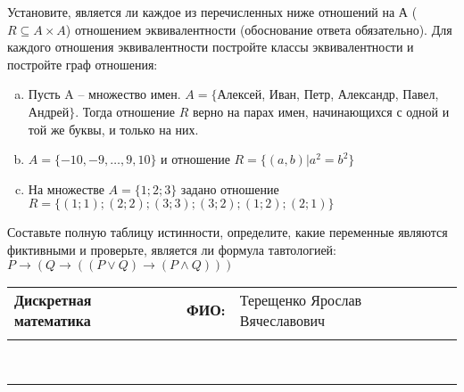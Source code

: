 \documentclass[10pt]{exam}
\newcommand{\class}{Дискретная математика}
\newcommand{\examdate}{}
\begin{document}
\begin{questions}
\question
Установите, является ли каждое из перечисленных ниже отношений на А ($R \subseteq A \times A$) отношением эквивалентности (обоснование ответа обязательно). Для каждого отношения эквивалентности постройте классы 
эквивалентности и постройте граф отношения:
\begin{enumerate} [a)]\setcounter{enumi}{0}
\item Пусть A – множество имен. $A = \{ $Алексей, Иван, Петр, Александр, Павел, Андрей$ \}$. Тогда отношение $R$ верно на парах имен, начинающихся с одной и той же буквы, и только на них.
\item $A = \{-10, -9, … , 9, 10\}$ и отношение $ R = \{(a,b)|a^{2} = b^{2}\}$
\item На множестве $A = \{1; 2; 3\}$ задано отношение $R = \{(1; 1); (2; 2); (3; 3); (3; 2); (1; 2); (2; 1)\}$
\end{enumerate}\question Составьте полную таблицу истинности, определите, какие переменные являются фиктивными и проверьте, является ли формула тавтологией:
$ P \rightarrow (Q \rightarrow ((P \lor Q) \rightarrow (P \land Q)))$

\end{questions}
\newpage
\begin{flushright}
\begin{tabular}{p{2.8in} r l}
\textbf{\class} & \textbf{ФИО:} &Терещенко Ярослав Вячеславович
\\

\textbf{\examdate} &&\\
\end{tabular}\\
\end{flushright}
\rule[1ex]{\textwidth}{.1pt}
\end{document}
